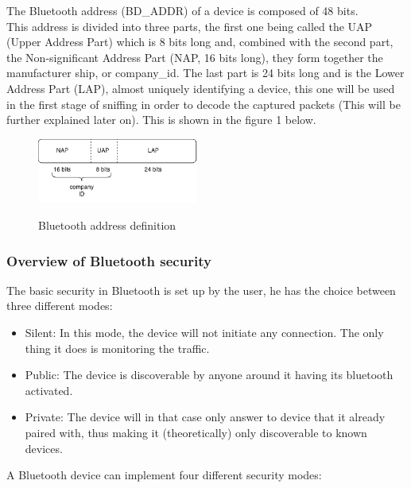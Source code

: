 The Bluetooth address (BD\_ADDR) of a device is composed of 48 bits. \\
This address is divided into three parts, the first one being called the UAP (Upper Address Part) which is 8 bits long and, combined with the second part, the Non-significant Address Part (NAP, 16 bits long), they form together the manufacturer ship, or company\_id. The last part is 24 bits long and is the Lower Address Part (LAP), almost uniquely identifying a device, this one will be used in the first stage of sniffing in order to decode the captured packets (This will be further explained later on). This is shown in the figure 1 below.\\

\begin{figure}[!h]
  \begin{center}
	\includegraphics[width=200px]{images/bd_addr.png}
	\label{Bluetooth address}
	\caption{Bluetooth address definition}
  \end{center}
\end{figure}
\newpage
\subsubsection{Overview of Bluetooth security}

The basic security in Bluetooth is set up by the user, he has the choice between three different modes:
\begin{itemize}[nolistsep,noitemsep]
 	\item Silent: In this mode, the device will not initiate any connection. The only thing it does is monitoring the traffic.
 	\item Public: The device is discoverable by anyone around it having its bluetooth activated.
 	\item Private: The device will in that case only answer to device that it already paired with, thus making it (theoretically) only discoverable to known devices.\\
\end{itemize}

\noindent A Bluetooth device can implement four different security modes:


